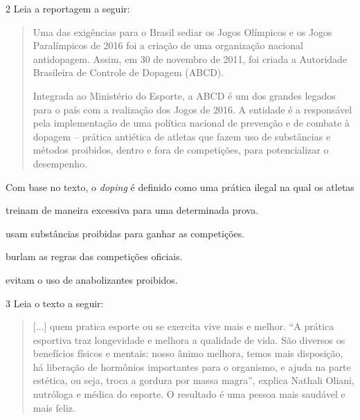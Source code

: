 \num{2} Leia a reportagem a seguir:

\begin{quote}
Uma das exigências para o Brasil sediar os Jogos Olímpicos e os Jogos
Paralímpicos de 2016 foi a criação de uma organização nacional
antidopagem. Assim, em 30 de novembro de 2011, foi criada a Autoridade
Brasileira de Controle de Dopagem (ABCD).

Integrada ao Ministério do Esporte, a ABCD é um dos grandes legados para
o país com a realização dos Jogos de 2016. A entidade é a responsável
pela implementação de uma política nacional de prevenção e de combate à
dopagem -- prática antiética de atletas que fazem uso de substâncias e
métodos proibidos, dentro e fora de competições, para potencializar o
desempenho.

\end{quote}

Com base no texto, o \textit{doping} é definido como uma prática ilegal 
na qual os atletas

\begin{escolha}
\item treinam de maneira excessiva para uma determinada prova.

\item usam substâncias proibidas para ganhar as competições.

\item burlam as regras das competições oficiais.

\item evitam o uso de anabolizantes proibidos.
\end{escolha}

\num{3}  Leia o texto a seguir:

\begin{quote}
{[}...{]} quem pratica esporte ou se exercita vive mais e melhor. ``A
prática esportiva traz longevidade e melhora a qualidade de vida. São
diversos os benefícios físicos e mentais: nosso ânimo melhora, temos
mais disposição, há liberação de hormônios importantes para o organismo,
e ajuda na parte estética, ou seja, troca a gordura por massa magra'',
explica Nathali Oliani, nutróloga e médica do esporte. O resultado é 
uma pessoa mais saudável e mais feliz.

\end{quote}


